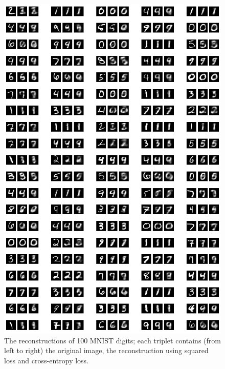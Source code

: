 \documentclass[fleqn]{report}
\begin{document}
\begin{figure}
    \centering
    \includegraphics[width=5.5in]{whole_plot.png}
    \caption{The reconstructions of 100 MNIST digits; each triplet contains (from left to right) the original image, the reconstruction using squared loss and cross-entropy loss.}
    \label{fig:mnist1}
\end{figure}
\end{document}
